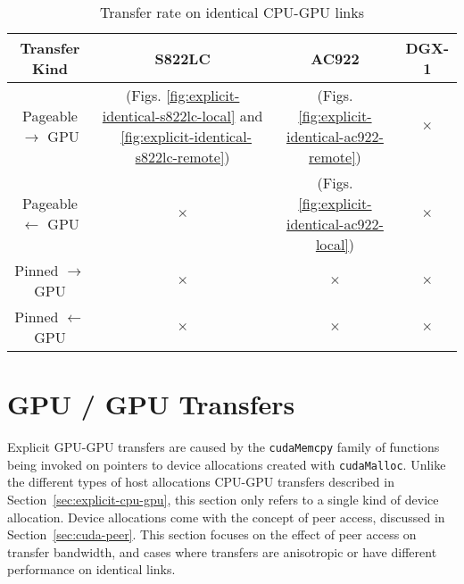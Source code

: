 \begin{table}[ht]
	\centering
	\caption[Transfer rate on identical CPU-GPU links]{Transfer rate on identical CPU-GPU links}
	\label{tab:explicit-identical}
	\begin{tabular}{cccc}
		\hline
		\textbf{Transfer Kind}     & \textbf{S822LC}                                                                                              & \textbf{AC922}                                               & \textbf{DGX-1} \\ \hline 
		Pageable $\rightarrow$ GPU & \checkmark (Figs. \ref{fig:explicit-identical-s822lc-local} and ~\ref{fig:explicit-identical-s822lc-remote}) & \checkmark (Figs. \ref{fig:explicit-identical-ac922-remote}) & $\times$       \\ \hline
		Pageable $\leftarrow$ GPU  & $\times$                                                                                                     & \checkmark (Figs. \ref{fig:explicit-identical-ac922-local})  & $\times$       \\ \hline
		Pinned $\rightarrow$ GPU   & $\times$                                                                                                     & $\times$                                                     & $\times$       \\ \hline
		Pinned $\leftarrow$ GPU    & $\times$                                                                                                     & $\times$                                                     & $\times$       \\ \hline
	\end{tabular}
\end{table}

\section{GPU / GPU Transfers}
\label{sec:explicit-gpu-gpu}

Explicit GPU-GPU transfers are caused by the \texttt{cudaMemcpy} family of functions being invoked on pointers to device allocations created with \texttt{cudaMalloc}.
Unlike the different types of host allocations CPU-GPU transfers described in Section~\ref{sec:explicit-cpu-gpu}, this section only refers to a single kind of device allocation.
Device allocations come with the concept of peer access, discussed in Section~\ref{sec:cuda-peer}.
This section focuses on the effect of peer access on transfer bandwidth, and cases where transfers are anisotropic or have different performance on identical links.

